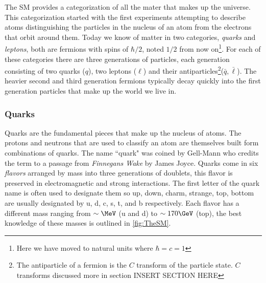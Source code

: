 The SM provides a categorization of all the mater that makes up the universe. This categorization started with the first experiments attempting to describe atoms distinguishing the particles in the nucleus of an atom from the electrons that orbit around them. Today we know of matter in two categories, \textit{quarks} and \textit{leptons}, both are fermions with spins of $\hbar/2$, noted $1/2$ from now on\footnote{Here we have moved to natural units where $\hbar = c = 1$}. For each of these categories there are three generations of particles, each generation consisting of two quarks ($q$), two leptons ($\ell$) and their antiparticles\footnote{The antiparticle of a fermion is the $C$ transform of the particle state. $C$ transforms discussed more in section INSERT SECTION HERE}($\bar{q}, \bar{\ell}$). The heavier second and third generation fermions typically decay quickly into the first generation particles that make up the world we live in.

\subsubsection{Quarks}
\label{sec:TheQuarks}

Quarks are the fundamental pieces that make up the nucleus of atoms. The protons and neutrons that are used to classify an atom are themselves built form combinations of quarks. The name ``quark" was coined by Gell-Mann who credits the term to a passage from \textit{Finnegans Wake} by James Joyce. Quarks come in six \textit{flavors} arranged by mass into three generations of doublets, this flavor is preserved in electromagnetic and strong interactions. The first letter of the quark name is often used to designate them so up, down, charm, strange, top, bottom are usually designated by u, d, c, s, t, and b respectively. Each flavor has a different mass ranging from $\sim\MeV$ (u and d) to $\sim170\GeV$ (top), the best knowledge of these masses is outlined in \ref{fig:TheSM}.

